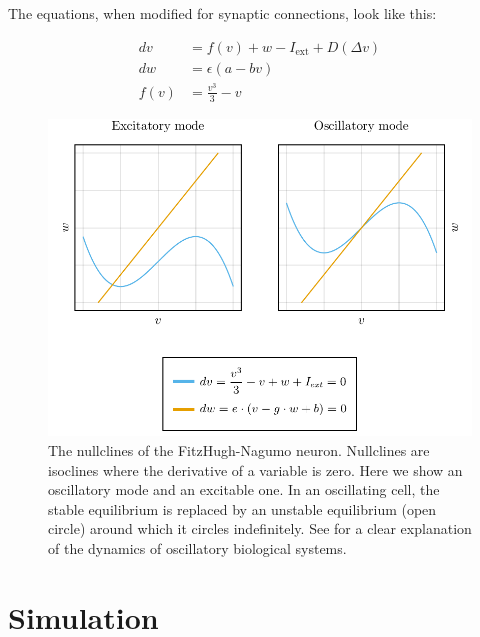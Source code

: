 \documentclass[
    11pt,
]{article}
\begin{document}
The equations, when modified for synaptic connections, look like this:

\begin{equation}
    \label{eq: fhnd}
    \begin{aligned}
        dv   &= f(v) + w - I_\mathrm{ext} + D(Δv)\\ %
        dw   &= ϵ(a - bv)\\
        f(v) &= \frac{v^3}{3} - v
    \end{aligned}
\end{equation}

\begin{figure}[h!]
    \label{fig: fhn_dynamics}
    \centering
    \includegraphics{figures/fhn_dynamics/fhn_dynamics.pdf}
    \caption{The nullclines of the FitzHugh-Nagumo neuron.  Nullclines are isoclines where the derivative of a variable is zero.  Here we show an oscillatory mode and an excitable one.  In an oscillating cell, the stable equilibrium is replaced by an unstable equilibrium (open circle) around which it circles indefinitely.  See \citet{parsons2018} for a clear explanation of the dynamics of oscillatory biological systems.}
\end{figure} %



\section{Simulation}
\end{document}

